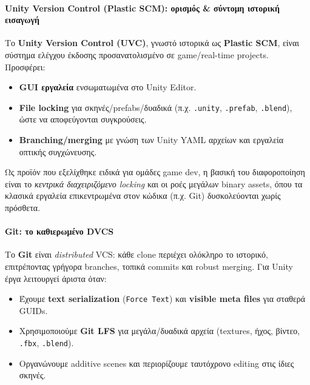 \paragraph*{Unity Version Control (Plastic SCM): ορισμός \& σύντομη ιστορική εισαγωγή}
Το \textbf{Unity Version Control (UVC)}, γνωστό ιστορικά ως \textbf{Plastic SCM}, είναι σύστημα ελέγχου έκδοσης προσανατολισμένο σε game/real-time projects. Προσφέρει:
\begin{itemize}
  \item \textbf{GUI εργαλεία} ενσωματωμένα στο Unity Editor.
  \item \textbf{File locking} για σκηνές/prefabs/δυαδικά (π.χ. \texttt{.unity}, \texttt{.prefab}, \texttt{.blend}), ώστε να αποφεύγονται συγκρούσεις.
  \item \textbf{Branching/merging} με γνώση των Unity YAML αρχείων και εργαλεία οπτικής συγχώνευσης.
\end{itemize}
Ως προϊόν που εξελίχθηκε ειδικά για ομάδες game dev, η βασική του διαφοροποίηση είναι το \emph{κεντρικά διαχειριζόμενο locking} και οι ροές μεγάλων binary assets, όπου τα κλασικά εργαλεία επικεντρωμένα στον κώδικα (π.χ. Git) δυσκολεύονται χωρίς πρόσθετα.

\paragraph*{Git: το καθιερωμένο DVCS}
Το \textbf{Git} είναι \textit{distributed} VCS: κάθε clone περιέχει ολόκληρο το ιστορικό, επιτρέποντας γρήγορα branches, τοπικά commits και robust merging. Για Unity έργα λειτουργεί άριστα όταν:
\begin{itemize}
  \item Έχουμε \textbf{text serialization} (\texttt{Force Text}) και \textbf{visible meta files} για σταθερά GUIDs.
  \item Χρησιμοποιούμε \textbf{Git LFS} για μεγάλα/δυαδικά αρχεία (textures, ήχος, βίντεο, \texttt{.fbx}, \texttt{.blend}).
  \item Οργανώνουμε additive scenes και περιορίζουμε ταυτόχρονο editing στις ίδιες σκηνές.
\end{itemize}

